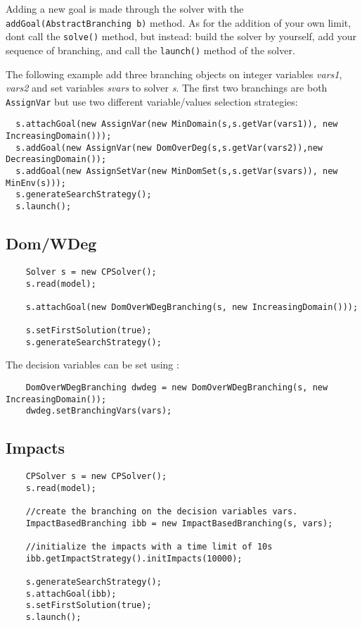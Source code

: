 Adding a new goal is made through the solver with the \texttt{addGoal(AbstractBranching b)} method. As for the addition of your own limit, dont call the \texttt{solve()} method, but instead: build the solver by yourself, add your sequence of branching, and call the \texttt{launch()} method of the solver. 

The following example add three branching objects on integer variables \emph{vars1}, \emph{vars2} and set variables \emph{svars} to solver \emph{s}. The first two branchings are both \texttt{AssignVar} but use two different variable/values selection strategies:
\begin{lstlisting}
  s.attachGoal(new AssignVar(new MinDomain(s,s.getVar(vars1)), new IncreasingDomain()));
  s.addGoal(new AssignVar(new DomOverDeg(s,s.getVar(vars2)),new DecreasingDomain());
  s.addGoal(new AssignSetVar(new MinDomSet(s,s.getVar(svars)), new MinEnv(s)));
  s.generateSearchStrategy();
  s.launch();
\end{lstlisting}


\subsection{Dom/WDeg}\label{solver:dom/wdeg}\hypertarget{solver:dom/wdeg}{}
\begin{lstlisting}
	Solver s = new CPSolver();
	s.read(model);
	    
	s.attachGoal(new DomOverWDegBranching(s, new IncreasingDomain()));
	    
	s.setFirstSolution(true);
	s.generateSearchStrategy();
\end{lstlisting}

The decision variables can be set using :
\begin{lstlisting}
	DomOverWDegBranching dwdeg = new DomOverWDegBranching(s, new IncreasingDomain());
	dwdeg.setBranchingVars(vars);
\end{lstlisting}

\subsection{Impacts}\label{solver:impacts}\hypertarget{solver:impacts}{}
\begin{lstlisting}
	CPSolver s = new CPSolver();
	s.read(model);
	
	//create the branching on the decision variables vars.
	ImpactBasedBranching ibb = new ImpactBasedBranching(s, vars);
	
	//initialize the impacts with a time limit of 10s 
	ibb.getImpactStrategy().initImpacts(10000);
	
	s.generateSearchStrategy();
	s.attachGoal(ibb);
	s.setFirstSolution(true);
	s.launch();
\end{lstlisting}

